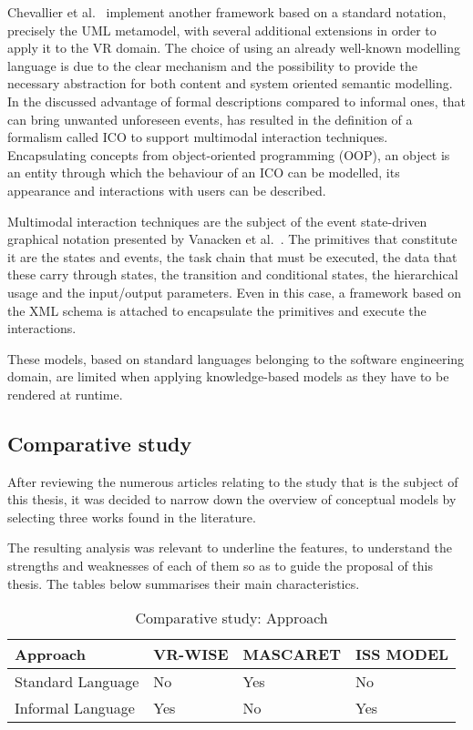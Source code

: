 Chevallier et al.~\cite{chevaillier_semantic_2012} implement another framework based on a standard notation, precisely the UML metamodel, with several additional extensions in order to apply it to the VR domain. The choice of using an already well-known modelling language is due to the clear mechanism and the possibility to provide the necessary abstraction for both content and system oriented semantic modelling. In \cite{costabile_formal_2005} the discussed advantage of formal descriptions compared to informal ones, that can bring unwanted unforeseen events, has resulted in the definition of a formalism called ICO to support multimodal interaction techniques. Encapsulating concepts from object-oriented programming (OOP), an object is an entity through which the behaviour of an ICO can be modelled, its appearance and interactions with users can be described.

Multimodal interaction techniques are the subject of the event state-driven graphical notation presented by Vanacken et al.~\cite{grapp06}. The primitives that constitute it are the states and events, the task chain that must be executed, the data that these carry through states, the transition and conditional states, the hierarchical usage and the input/output parameters.  Even in this case, a framework based on the XML schema is attached to encapsulate the primitives and execute the interactions.

These models, based on standard languages belonging to the software engineering domain, are limited when applying knowledge-based models as they have to be rendered at runtime.

\subsection{Comparative study}

After reviewing the numerous articles relating to the study that is the subject of this thesis, it was decided to narrow down the overview of conceptual models by selecting three works found in the literature.

The resulting analysis was relevant to underline the features, to understand the strengths and weaknesses of each of them so as to guide the proposal of this thesis. The tables below summarises their main characteristics. 

\begin{table}
\begin{tabular}{|p{2.5cm}|p{3cm}|p{3cm}|p{3cm}|} 
\hline %
\textbf{Approach} 
& \textbf{VR-WISE} 
& \textbf{MASCARET}
& \textbf{ISS MODEL} \\ 
\hline
Standard Language
& No
& Yes
& No\\ 
\hline
Informal Language
& Yes
& No
& Yes\\ 
\hline
\end{tabular} 
\caption{Comparative study: Approach}
\label{table:Approach}
\end{table}

